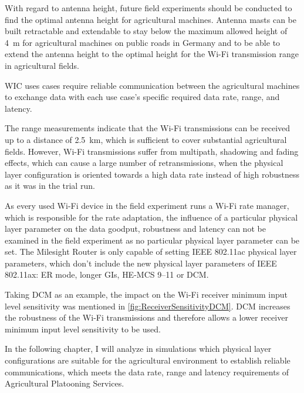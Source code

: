 With regard to antenna height, future field experiments should be conducted to find the optimal antenna height for
agricultural machines.
Antenna masts can be built retractable and extendable to stay below the maximum allowed height of \SI{4}{\metre} for
agricultural machines on public roads in Germany and to be able to extend the antenna height to the optimal height
for the Wi-Fi transmission range in agricultural fields.

\ac{WIC} uses cases require reliable communication between the agricultural machines to exchange data
with each use case's specific required data rate, range, and latency.

The range measurements indicate that the Wi-Fi transmissions can be received up to a distance of \SI{2.5}{\kilo\metre},
which is sufficient to cover substantial agricultural fields.
However, Wi-Fi transmissions suffer from multipath, shadowing and fading effects, which can cause a large number of retransmissions,
when the physical layer configuration is oriented towards a high data rate instead of high robustness as it was
in the trial run.

As every used Wi-Fi device in the field experiment runs a Wi-Fi rate manager, which is responsible for the rate adaptation,
the influence of a particular physical layer parameter on the data goodput, robustness and latency can not be examined in the field experiment as no particular physical layer parameter can be set.
The Milesight Router is only capable of setting IEEE 802.11ac physical layer parameters, which don't include the new physical layer parameters of IEEE 802.11ax:
\ac{ER} mode, longer \ac{GI}s, \ac{HE}-\ac{MCS} \numrange{9}{11} or \ac{DCM}.

Taking \ac{DCM} as an example, the impact on the Wi-Fi receiver minimum input level sensitivity was mentioned in \autoref{fig:ReceiverSensitivityDCM}. \ac{DCM}
increases the robustness of the Wi-Fi transmissions and therefore allows a lower receiver minimum input level sensitivity to be used.

In the following chapter, I will analyze in simulations which physical layer
configurations are suitable for the agricultural environment to establish reliable communications,
which meets the data rate, range and latency requirements of Agricultural Platooning Services.
